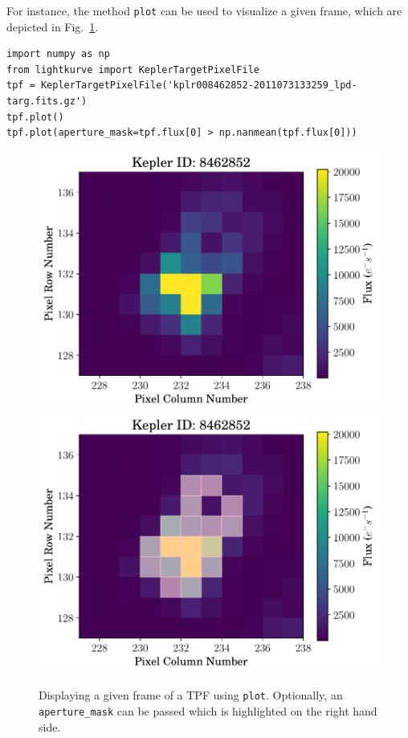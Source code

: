 \documentclass{article}
\begin{document}
        For instance, the method \texttt{plot} can be used to visualize a
        given frame, which are depicted in Fig.~\ref{fig:plot-method}.
\begin{verbatim}
import numpy as np
from lightkurve import KeplerTargetPixelFile
tpf = KeplerTargetPixelFile('kplr008462852-2011073133259_lpd-targ.fits.gz')
tpf.plot()
tpf.plot(aperture_mask=tpf.flux[0] > np.nanmean(tpf.flux[0]))
\end{verbatim}

        \begin{figure}[!htb]
            \includegraphics[scale=.4]{figs/tpf-plot.pdf}
            \includegraphics[scale=.4]{figs/tpf-plot-aperture.pdf}
            \caption{Displaying a given frame of a TPF using \texttt{plot}.
            Optionally, an \texttt{aperture\_mask} can be passed which is
            highlighted on the right hand side.}
            \label{fig:plot-method}
        \end{figure}
\end{document}

